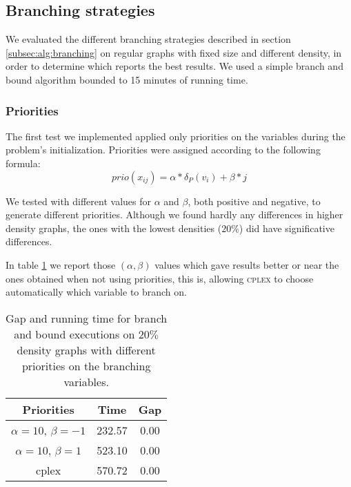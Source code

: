 
\subsection{Branching strategies}
\label{subsec:resultsbranching}

We evaluated the different branching strategies described in section \ref{subsec:alg:branching} on regular graphs with fixed size and different density, in order to determine which reports the best results. We used a simple branch and bound algorithm bounded to 15 minutes of running time.

\subsubsection{Priorities}

The first test we implemented applied only priorities on the variables during the problem's initialization. Priorities were assigned according to the following formula:
\begin{equation*}
	prio(x_{ij}) = \alpha * \delta_P(v_i) + \beta * j
\end{equation*}

We tested with different values for $\alpha$ and $\beta$, both positive and negative, to generate different priorities. Although we found hardly any differences in higher density graphs, the ones with the lowest densities ($20\%$) did have significative differences.

In table \ref{table:branch:static} we report those $(\alpha,\beta)$ values which gave results better or near the ones obtained when not using priorities, this is, allowing \textsc{cplex} to choose automatically which variable to branch on.

\begin{table}[h]
\centering

\begin{tabular}{|c|c|c|}
\hline
\textbf{Priorities} & \textbf{Time} & \textbf{Gap} \\
\hline
$\alpha = 10$, $\beta = -1$ &  232.57 & 0.00 \\
$\alpha = 10$, $\beta = 1$ & 523.10 & 0.00 \\
cplex & 570.72 & 0.00 \\
\hline
 \end{tabular}

\caption{Gap and running time for branch and bound executions on $20\%$ density graphs with different priorities on the branching variables.}
\label{table:branch:static}

\end{table}	

